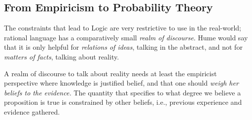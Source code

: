\documentclass[
  letterpaper,
  12pt,
  british]{tufte-book}
\theoremstyle{plain}
\theoremstyle{plain}
\theoremstyle{definition}
\theoremstyle{remark}
\begin{document}
\hypertarget{sec-from_empiricism}{%
\subsection{From Empiricism to Probability
Theory}\label{sec-from_empiricism}}

The constraints that lead to Logic are very restrictive to use in the
real-world; rational language has a comparatively small \emph{realm of
discourse}. Hume would say that it is only helpful for \emph{relations
of ideas}, talking in the abstract, and not for \emph{matters of facts},
talking about reality.

A realm of discourse to talk about reality needs at least the empiricist
perspective where knowledge is justified belief, and that one should
\emph{weigh her beliefs to the evidence.} The quantity that specifies to
what degree we believe a proposition is true is constrained by other
beliefs, i.e., previous experience and evidence gathered.
\end{document}
